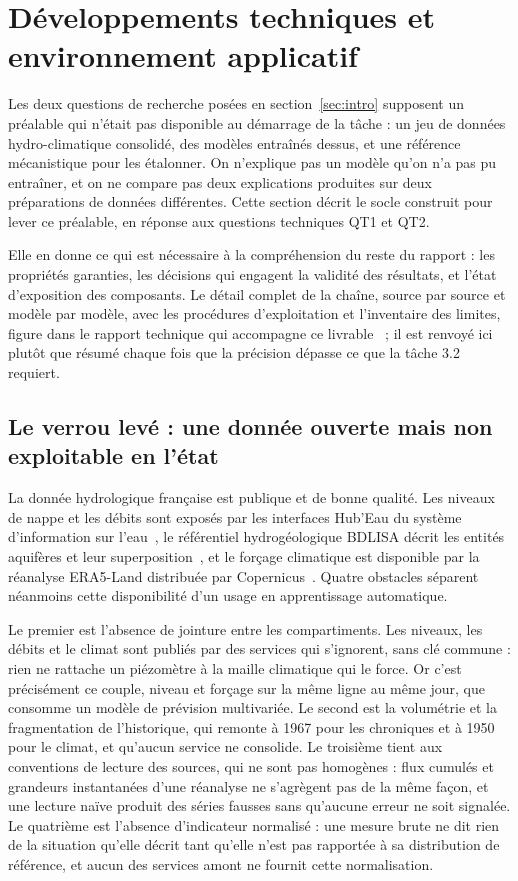\newpage
\section{Développements techniques et environnement applicatif}
\label{sec:app}

Les deux questions de recherche posées en section~\ref{sec:intro} supposent un préalable qui n'était pas disponible au démarrage de la tâche : un jeu de données hydro-climatique consolidé, des modèles entraînés dessus, et une référence mécanistique pour les étalonner. On n'explique pas un modèle qu'on n'a pas pu entraîner, et on ne compare pas deux explications produites sur deux préparations de données différentes. Cette section décrit le socle construit pour lever ce préalable, en réponse aux questions techniques QT1 et QT2.

Elle en donne ce qui est nécessaire à la compréhension du reste du rapport : les propriétés garanties, les décisions qui engagent la validité des résultats, et l'état d'exposition des composants. Le détail complet de la chaîne, source par source et modèle par modèle, avec les procédures d'exploitation et l'inventaire des limites, figure dans le rapport technique qui accompagne ce livrable~\cite{ringuet2026socle} ; il est renvoyé ici plutôt que résumé chaque fois que la précision dépasse ce que la tâche 3.2 requiert.

\subsection{Le verrou levé : une donnée ouverte mais non exploitable en l'état}

La donnée hydrologique française est publique et de bonne qualité. Les niveaux de nappe et les débits sont exposés par les interfaces Hub'Eau du système d'information sur l'eau~\cite{hubeau}, le référentiel hydrogéologique BDLISA décrit les entités aquifères et leur superposition~\cite{bdlisa}, et le forçage climatique est disponible par la réanalyse ERA5-Land distribuée par Copernicus~\cite{hersbach2020era5, munozsabater2021era5land, cds}. Quatre obstacles séparent néanmoins cette disponibilité d'un usage en apprentissage automatique.

Le premier est l'absence de jointure entre les compartiments. Les niveaux, les débits et le climat sont publiés par des services qui s'ignorent, sans clé commune : rien ne rattache un piézomètre à la maille climatique qui le force. Or c'est précisément ce couple, niveau et forçage sur la même ligne au même jour, que consomme un modèle de prévision multivariée. Le second est la volumétrie et la fragmentation de l'historique, qui remonte à 1967 pour les chroniques et à 1950 pour le climat, et qu'aucun service ne consolide. Le troisième tient aux conventions de lecture des sources, qui ne sont pas homogènes : flux cumulés et grandeurs instantanées d'une réanalyse ne s'agrègent pas de la même façon, et une lecture naïve produit des séries fausses sans qu'aucune erreur ne soit signalée. Le quatrième est l'absence d'indicateur normalisé : une mesure brute ne dit rien de la situation qu'elle décrit tant qu'elle n'est pas rapportée à sa distribution de référence, et aucun des services amont ne fournit cette normalisation.

